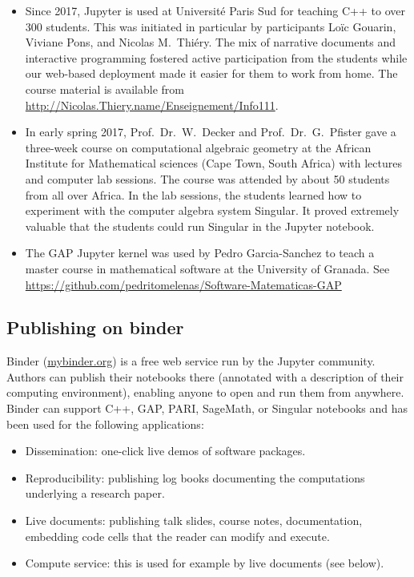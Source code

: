 \documentclass{deliverablereport}
\begin{document}
\begin{itemize}
\item Since 2017, Jupyter is used at Université Paris Sud for teaching C++ to over 300 students.
This was initiated in particular by \ODK participants Loïc Gouarin, Viviane Pons, and Nicolas M.\ Thiéry.
The mix of narrative documents and interactive programming fostered active participation from the students
while our web-based deployment made it easier for them to work from home.
The course material is available from \url{http://Nicolas.Thiery.name/Enseignement/Info111}.

\item In early spring 2017, Prof.~Dr.~W.~Decker and Prof.~Dr.~G.~Pfister gave a
three-week course on computational algebraic geometry at the
African Institute for Mathematical sciences (Cape Town, South Africa)
with lectures and computer lab sessions.
The course was attended by about 50 students from all over Africa.
In the lab sessions, the students learned how to experiment with the computer algebra system Singular.
It proved extremely valuable that the students could run Singular in the Jupyter notebook.

\item The GAP Jupyter kernel was used by Pedro Garcia-Sanchez to teach a master course in mathematical software at the University of Granada.
See \url{https://github.com/pedritomelenas/Software-Matematicas-GAP}
\end{itemize}

\subsection{Publishing on binder}

Binder (\url{mybinder.org}) is a free web service run by the Jupyter community.
Authors can publish their notebooks there (annotated with a description of their computing environment),
enabling anyone to open and run them from anywhere.
Binder can support C++, GAP, PARI, SageMath, or Singular notebooks and has been used for the following applications:

\begin{itemize}
\item Dissemination: one-click live demos of software packages.
\item Reproducibility: publishing log books documenting the computations underlying a research paper.
\item Live documents: publishing talk slides, course notes, documentation,
      embedding code cells that the reader can modify and execute.
\item Compute service: this is used for example by live documents (see below).
\end{itemize}
\end{document}
